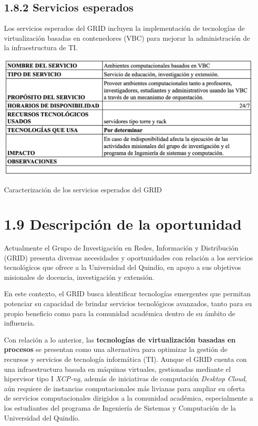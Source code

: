 \subsection*{1.8.2 Servicios esperados}
Los servicios esperados del GRID incluyen la implementación de tecnologías de virtualización basadas en contenedores (VBC) para mejorar la administración de la infraestructura de TI.

\begin{table}[H]
    \centering
    \includegraphics[width=\textwidth] {tablas-images/cp1/servicios-esperados/servicios-esperados.png}
    \caption{Caracterización de los servicios esperados del GRID}
    \label{tab:servicios-esperados}
\end{table}

\section*{1.9 Descripción de la oportunidad}

Actualmente el Grupo de Investigación en Redes, Información y Distribución (GRID) presenta diversas necesidades y oportunidades con relación a los servicios tecnológicos que ofrece a la Universidad del Quindío, en apoyo a sus objetivos misionales de docencia, investigación y extensión.

En este contexto, el GRID busca identificar tecnologías emergentes que permitan potenciar su capacidad de brindar servicios tecnológicos avanzados, tanto para su propio beneficio como para la comunidad académica dentro de su ámbito de influencia.

Con relación a lo anterior, las \textbf{tecnologías de virtualización basadas en procesos} se presentan como una alternativa para optimizar la gestión de recursos y servicios de tecnología informática (TI). Aunque el GRID cuenta con una infraestructura basada en máquinas virtuales, gestionadas mediante el hipervisor tipo I \textit{XCP-ng}, además de iniciativas de computación \textit{Desktop Cloud}, aún requiere de instancias computacionales más livianas para ampliar su oferta de servicios computacionales dirigidos a la comunidad académica, especialmente a los estudiantes del programa de Ingeniería de Sistemas y Computación de la Universidad del Quindío.

